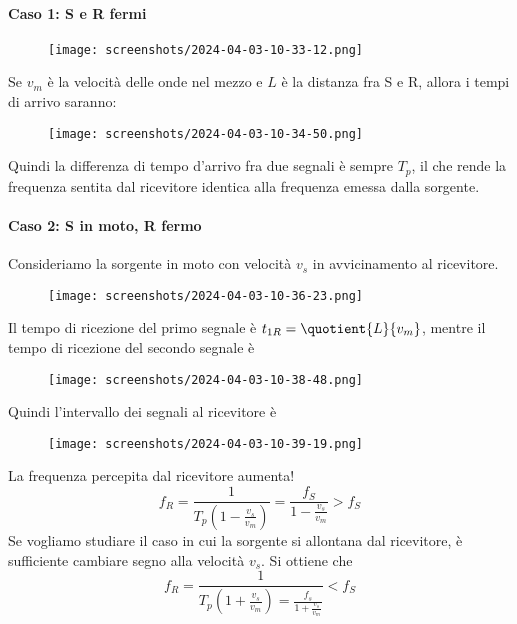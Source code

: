 \paragraph{Caso 1: S e R fermi}
\begin{figure}[H]
	\centering
	\texttt{[image: screenshots/2024-04-03-10-33-12.png]}
\end{figure}
Se \(v_m\) è la velocità delle onde nel mezzo e \(L\) è la distanza fra S e R, allora i tempi di arrivo saranno:
\begin{figure}[H]
	\centering
	\texttt{[image: screenshots/2024-04-03-10-34-50.png]}
\end{figure}
Quindi la differenza di tempo d'arrivo fra due segnali è sempre \(T_p\), il che rende la frequenza sentita dal ricevitore identica alla frequenza emessa dalla sorgente.

\paragraph{Caso 2: S in moto, R fermo} Consideriamo la sorgente in moto con velocità \(v_s\) in avvicinamento al ricevitore.
\begin{figure}[H]
	\centering
	\texttt{[image: screenshots/2024-04-03-10-36-23.png]}
\end{figure}
Il tempo di ricezione del primo segnale è \(t_{1R} = \quotient{L}{v_m} \), mentre il tempo di ricezione del secondo segnale è
\begin{figure}[H]
	\centering
	\texttt{[image: screenshots/2024-04-03-10-38-48.png]}
\end{figure}
Quindi l'intervallo dei segnali al ricevitore è
\begin{figure}[H]
	\centering
	\texttt{[image: screenshots/2024-04-03-10-39-19.png]}
\end{figure}
La frequenza percepita dal ricevitore aumenta!
\[
	f_R = \frac{1}{T_p \left( 1- \frac{v_s}{v_m} \right) } = \frac{f_S}{1- \frac{v_s}{v_m}} > f_S
\]
Se vogliamo studiare il caso in cui la sorgente si allontana dal ricevitore, è sufficiente cambiare segno alla velocità \(v_s\). Si ottiene che
\[
	f_R = \frac{1}{T_p \left( 1+ \frac{v_s}{v_m} \right)  = \frac{f_s}{1 + \frac{v_s}{v_m}}} < f_S
\]


